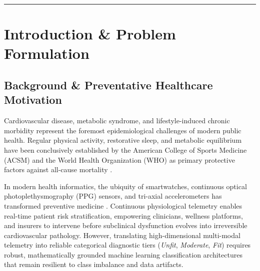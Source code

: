 \documentclass[11pt,a4paper]{article}
\begin{document}
\vspace{0.8em}
\hrule
\vspace{0.8em}

\tableofcontents
\newpage


\section{Introduction \& Problem Formulation}

\subsection{Background \& Preventative Healthcare Motivation}
Cardiovascular disease, metabolic syndrome, and lifestyle-induced chronic morbidity represent the foremost epidemiological challenges of modern public health. Regular physical activity, restorative sleep, and metabolic equilibrium have been conclusively established by the American College of Sports Medicine (ACSM) and the World Health Organization (WHO) as primary protective factors against all-cause mortality \citep{acsm2021,who2020}. 

In modern health informatics, the ubiquity of smartwatches, continuous optical photoplethysmography (PPG) sensors, and tri-axial accelerometers has transformed preventive medicine \citep{dunn2021,smuck2021}. Continuous physiological telemetry enables real-time patient risk stratification, empowering clinicians, wellness platforms, and insurers to intervene before subclinical dysfunction evolves into irreversible cardiovascular pathology. However, translating high-dimensional multi-modal telemetry into reliable categorical diagnostic tiers (\emph{Unfit}, \emph{Moderate}, \emph{Fit}) requires robust, mathematically grounded machine learning classification architectures that remain resilient to class imbalance and data artifacts.
\end{document}
